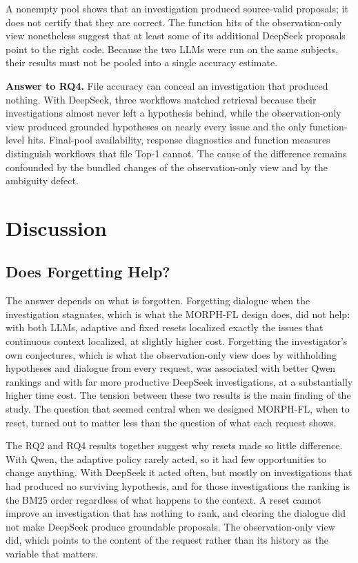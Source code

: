 \documentclass[a4paper,fleqn]{cas-sc}
\newcommand{\tool}{MORPH-FL}
\begin{document}
A nonempty pool shows that an investigation produced source-valid proposals; it does not certify that they are correct. The function hits of the observation-only view nonetheless suggest that at least some of its additional DeepSeek proposals point to the right code. Because the two LLMs were run on the same subjects, their results must not be pooled into a single accuracy estimate.

\noindent\textbf{Answer to RQ4.} File accuracy can conceal an investigation that produced nothing. With DeepSeek, three workflows matched retrieval because their investigations almost never left a hypothesis behind, while the observation-only view produced grounded hypotheses on nearly every issue and the only function-level hits. Final-pool availability, response diagnostics and function measures distinguish workflows that file Top-1 cannot. The cause of the difference remains confounded by the bundled changes of the observation-only view and by the ambiguity defect.

\section{Discussion}\label{sec:discussion}
\subsection{Does Forgetting Help?}
The answer depends on what is forgotten. Forgetting dialogue when the investigation stagnates, which is what the \tool{} design does, did not help: with both LLMs, adaptive and fixed resets localized exactly the issues that continuous context localized, at slightly higher cost. Forgetting the investigator's own conjectures, which is what the observation-only view does by withholding hypotheses and dialogue from every request, was associated with better Qwen rankings and with far more productive DeepSeek investigations, at a substantially higher time cost. The tension between these two results is the main finding of the study. The question that seemed central when we designed \tool{}, when to reset, turned out to matter less than the question of what each request shows.

The RQ2 and RQ4 results together suggest why resets made so little difference. With Qwen, the adaptive policy rarely acted, so it had few opportunities to change anything. With DeepSeek it acted often, but mostly on investigations that had produced no surviving hypothesis, and for those investigations the ranking is the BM25 order regardless of what happens to the context. A reset cannot improve an investigation that has nothing to rank, and clearing the dialogue did not make DeepSeek produce groundable proposals. The observation-only view did, which points to the content of the request rather than its history as the variable that matters.
\end{document}
